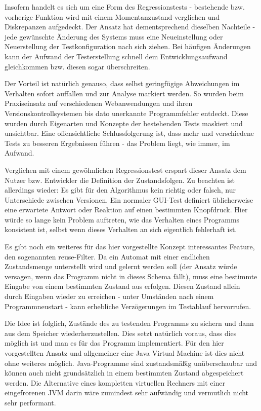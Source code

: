 Insofern handelt es sich um eine Form des Regressionstests \cite{regression} - bestehende bzw.
vorherige Funktion wird mit einem Momentanzustand verglichen und Diskrepanzen aufgedeckt. Der
Ansatz hat dementsprechend dieselben Nachteile - jede gewünschte Änderung des Systems muss eine
Neueinstellung oder Neuerstellung der Testkonfiguration nach sich ziehen. Bei häufigen
Änderungen kann der Aufwand der Testerstellung schnell dem Entwicklungsaufwand gleichkommen bzw.
diesen sogar überschreiten.

Der Vorteil ist natürlich genauso, dass selbst geringfügige Abweichungen im Verhalten sofort
auffallen und zur Analyse markiert werden. So wurden beim Praxiseinsatz auf verschiedenen
Webanwendungen und ihren Versionskontrollsystemen bis dato unerkannte Programmfehler entdeckt.
Diese wurden durch Eigenarten und Konzepte der bestehenden Tests maskiert und unsichtbar.
Eine offensichtliche Schlussfolgerung ist, dass mehr und verschiedene Tests zu besseren
Ergebnissen führen - das Problem liegt, wie immer, im Aufwand.

Verglichen mit einem gewöhnlichen Regressionstest erspart dieser Ansatz dem Nutzer
bzw. Entwickler die Definition der Zustandsfolgen. Zu beachten ist allerdings wieder:
Es gibt für den Algorithmus kein richtig oder falsch, nur Unterschiede zwischen Versionen.
Ein normaler GUI-Test definiert üblicherweise eine erwartete Antwort oder Reaktion auf einen
bestimmten Knopfdruck. Hier würde so lange kein \glqq{}Problem\grqq{} auftreten, wie das Verhalten eines
Programms konsistent ist, selbst wenn dieses Verhalten an sich eigentlich fehlerhaft ist.

Es gibt noch ein weiteres für das hier vorgestellte Konzept interessantes Feature,
den sogenannten reuse-Filter. Da ein Automat mit einer endlichen Zustandsmenge unterstellt
wird und gelernt werden soll (der Ansatz würde versagen, wenn das Programm nicht in dieses
Schema fällt), muss eine bestimmte Eingabe von einem bestimmten Zustand aus erfolgen.
Diesen Zustand allein durch Eingaben wieder zu erreichen - unter Umständen nach einem Programmneustart -
kann erhebliche Verzögerungen im Testablauf hervorrufen.

Die Idee ist folglich, Zustände des
zu testenden Programms zu sichern und dann aus dem Speicher wiederherzustellen. Dies setzt
natürlich voraus, dass dies möglich ist und man es für das Programm implementiert.
Für den hier vorgestellten Ansatz und allgemeiner eine Java Virtual Machine ist dies nicht
ohne weiteres möglich. Java-Programme sind zustandsmäßig unüberschaubar und können auch nicht
grundsätzlich in einem bestimmten Zustand abgespeichert werden. Die Alternative
eines kompletten virtuellen Rechners mit einer eingefrorenen JVM darin wäre
zumindest sehr aufwändig und vermutlich nicht sehr performant.

